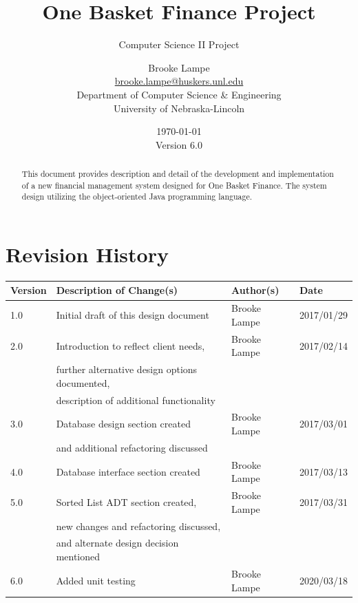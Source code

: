 \documentclass[12pt]{scrartcl} %
\title{One Basket Finance Project}
\subtitle{Computer Science II Project}
\author{Brooke Lampe\\
\href{mailto:brooke.lampe@huskers.unl.edu}{brooke.lampe@huskers.unl.edu} \\
Department of Computer Science \& Engineering\\
University of Nebraska-Lincoln\\
}
\date{\today \\
Version 6.0
}
\begin{document}
    \maketitle
    \thispagestyle{empty}

    \vfill

    \begin{abstract}
        This document provides description and detail of the development and implementation of a new financial management system designed for One Basket Finance.  The system design utilizing the object-oriented Java programming language.
    \end{abstract}

    \newpage
    \clearpage
    \setcounter{page}{1}
    \section*{Revision History}

    \begin{tabular}{|l|l|l|l|}
        \hline
        Version & Description of Change(s) & Author(s) & Date \\
        \hline
        1.0 & Initial draft of this design document & Brooke Lampe & 2017/01/29 \\
        \hline
        2.0 & Introduction to reflect client needs, & Brooke Lampe & 2017/02/14 \\
        & further alternative design options documented, & & \\
        & description of additional functionality & & \\
        \hline
        3.0 & Database design section created & Brooke Lampe & 2017/03/01 \\
        & and additional refactoring discussed & & \\
        \hline
        4.0 & Database interface section created & Brooke Lampe & 2017/03/13 \\
        \hline
        5.0 & Sorted List ADT section created, & Brooke Lampe & 2017/03/31 \\
        & new changes and refactoring discussed, & & \\
        & and alternate design decision mentioned & & \\
        \hline
        6.0 & Added unit testing & Brooke Lampe & 2020/03/18 \\
        \hline
    \end{tabular}

    \newpage
    \tableofcontents
\end{document}
